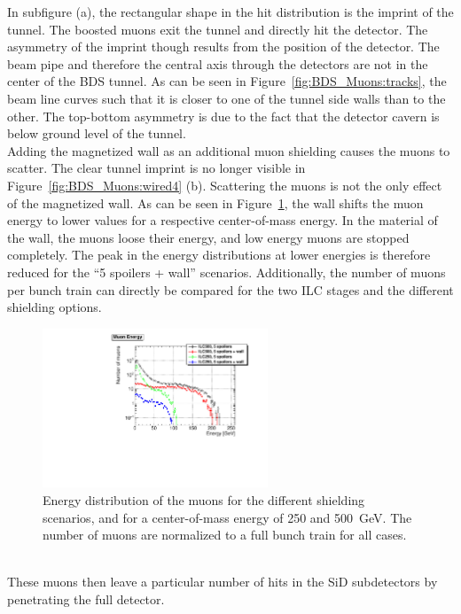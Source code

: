 In subfigure (a), the rectangular shape in the hit distribution is the imprint of the tunnel.
The boosted muons exit the tunnel and directly hit the detector.
The asymmetry of the imprint though results from the position of the detector.
The beam pipe and therefore the central axis through the detectors are not in the center of the BDS tunnel.
As can be seen in Figure~\ref{fig:BDS_Muons:tracks}, the beam line curves such that it is closer to one of the tunnel side walls than to the other.
The top-bottom asymmetry is due to the fact that the detector cavern is below ground level of the tunnel.
\\Adding the magnetized wall as an additional muon shielding causes the muons to scatter.
The clear tunnel imprint is no longer visible in Figure~\ref{fig:BDS_Muons:wired4} (b).
Scattering the muons is not the only effect of the magnetized wall.
As can be seen in Figure~\ref{fig:BDS_Muons:energy}, the wall shifts the muon energy to lower values for a respective center-of-mass energy.
In the material of the wall, the muons loose their energy, and low energy muons are stopped completely. 
The peak in the energy distributions at lower energies is therefore reduced for the ``5 spoilers + wall'' scenarios.
Additionally, the number of muons per bunch train can directly be compared for the two ILC stages and the different shielding options.
\begin{figure}[htbp]
\centering
\includegraphics[width=0.6\textwidth]{Figures/BDS_muons/Energy_Comparison_ILC500vsILC250.pdf}
\caption[Muon energy]{Energy distribution of the muons for the different shielding scenarios, and for a center-of-mass energy of 250 and \SI{500}{\GeV}.
The number of muons are normalized to a full bunch train for all cases.}
\label{fig:BDS_Muons:energy}
\end{figure}
\\These muons then leave a particular number of hits in the SiD subdetectors by penetrating the full detector.
